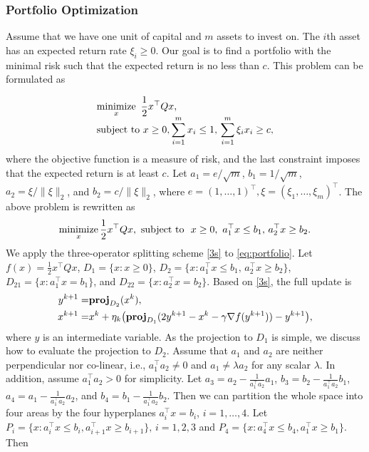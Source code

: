 \subsubsection{Portfolio Optimization}
Assume that we have one unit of capital and $m$ assets to invest on. The $i$th asset has an expected return rate $\xi_i\ge 0$. Our goal is to find a portfolio with the minimal risk such that the expected return is no less than $c$. This problem can be formulated as

\begin{equation*}
\begin{array}{l}
\displaystyle
\Min_x ~ \frac{1}{2} x^\top Q x, \\
\displaystyle
\text{subject to}~ x\ge0, \sum_{i=1}^m x_i\le 1,\, \sum_{i=1}^m\xi_i x_i\ge c,
\end{array}
\end{equation*}
where the objective function is a measure of risk, and the last constraint imposes that the expected return is at least $c$. Let $a_1=e/\sqrt{m}$, $b_1=1/\sqrt{m}$, $a_2=\xi/\|\xi\|_2$, and $b_2=c/\|\xi\|_2$, where $e = (1, \dots, 1)^\top, \xi = (\xi_1, \dots, \xi_m)^\top$. The above problem is rewritten as
\begin{equation}\label{eq:portfolio}
\Min_x \frac{1}{2} x^\top Q x,\ \text{subject to }\ x\ge0, ~a_1^\top x\le b_1,\, a_2^\top x\ge b_2.
\end{equation}
We apply the three-operator splitting scheme \eqref{3s} to \eqref{eq:portfolio}. Let $f(x)=\frac{1}{2}x^\top Q x$, $D_1=\{x: x\ge 0\}$, $D_2=\{x: a_1^\top x \le b_1,\, a_2^\top x\ge b_2\}$, $D_{21}=\{x: a_1^\top x=b_1\}$, and $D_{22}=\{x: a_2^\top x=b_2\}$. Based on \eqref{3s}, the full update is
\begin{subequations}\label{eq:3op-portfolio}
\begin{align}
y^{k+1}=&\prj_{D_2}(x^k),\\
x^{k+1}=&x^k+\eta_k\big(\prj_{D_1}(2y^{k+1}-x^k-\gamma \nabla f(y^{k+1}))-y^{k+1}\big), \end{align}
\end{subequations}
where $y$ is an intermediate variable. As the projection to $D_1$ is simple, we discuss how to evaluate the projection to $D_2$. Assume that $a_1$ and $a_2$ are neither perpendicular nor co-linear, i.e., $a_1^\top a_2\neq 0$ and $a_1\neq \lambda a_2$ for any scalar $\lambda$. In addition, assume $a_1^\top a_2>0$ for simplicity. Let $a_3=a_2-\frac{1}{a_1^\top a_2} a_1$, $b_3=b_2-\frac{1}{a_1^\top a_2} b_1$, $a_4=a_1-\frac{1}{a_1^\top a_2} a_2$, and $b_4=b_1-\frac{1}{a_1^\top a_2} b_2$. Then we can partition the whole space into four areas by the four hyperplanes $a_i^\top x=b_i$, $i=1,\ldots,4$. Let $P_i=\{x: a_i^\top x\le b_i, a_{i+1}^\top x\ge b_{i+1}\},\, i=1,2,3$ and $P_4=\{x: a_4^\top x\le b_4, a_1^\top x\ge b_1\}$. Then
